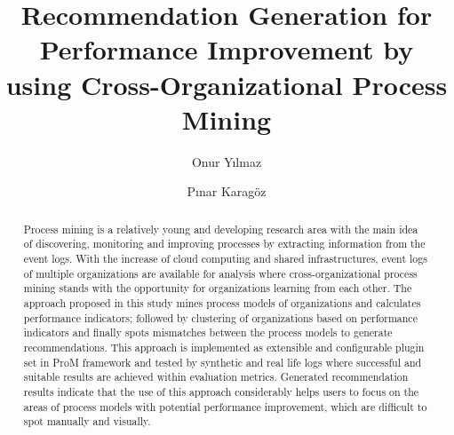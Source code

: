 \documentclass[runningheads,a4paper]{llncs}
\begin{document}


\title{Recommendation Generation for Performance Improvement by using Cross-Organizational Process Mining}

\author{Onur Yılmaz \and Pınar Karagöz}
%
\iffalse
\author{Firstname Lastname\inst{1} \and Firstname Lastname\inst{2} }

\institute{
Insitute 1\\
\email{...}\and
Insitute 2\\
\email{...}
}
\fi
			
\maketitle

\begin{abstract}
Process mining is a relatively young and developing research area with the main idea of discovering, monitoring and improving processes by extracting information from the event logs. With the increase of cloud computing and shared infrastructures, event logs of multiple organizations are available for analysis where cross-organizational process mining stands with the opportunity for organizations learning from each other. The approach proposed in this study mines process models of organizations and calculates performance indicators; followed by clustering of organizations based on performance indicators and finally spots mismatches between the process models to generate recommendations. This approach is implemented as extensible and configurable plugin set in ProM framework and tested by synthetic and real life logs where successful and suitable results are achieved within evaluation metrics. Generated recommendation results indicate that the use of this approach considerably helps users to focus on the areas of process models with potential performance improvement, which are difficult to spot manually and visually.
\end{abstract}








\end{document}

